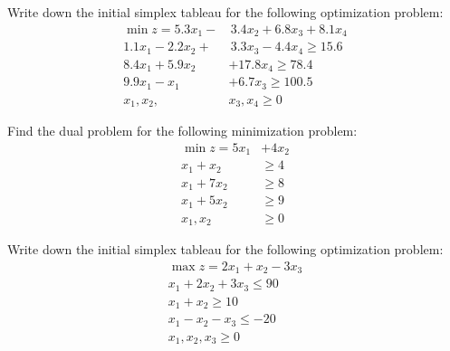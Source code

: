 \documentclass[11pt,letterpaper]{article}
\begin{document}

 Write down the initial simplex tableau for the following optimization problem:
	\[
	\begin{aligned}
	\min z= 5.3x_1 - &\,3.4x_2 + 6.8x_3 + 8.1x_4 \\
	1.1x_1 - 2.2x_2 + &\,3.3x_3 - 4.4x_4 \geq 15.6 \\
	8.4x_1 + 5.9x_2 &+ 17.8x_4 \geq 78.4 \\
	9.9x_1 - x_1 &+ 6.7 x_3 \geq 100.5 \\
	x_1, x_2, &x_3, x_4 \geq 0 
	\end{aligned}
	\]



\newpage



 Find the dual problem for the following minimization problem:
	\[
	\begin{aligned}
	\min z= 5x_1 &+ 4x_2 \\
	x_1 + x_2 &\geq 4 \\
	x_1 + 7x_2 &\geq 8 \\
	x_1 + 5x_2 &\geq 9 \\
	x_1, x_2 &\geq 0 
	\end{aligned}
	\]



\newpage



 Write down the initial simplex tableau for the following optimization problem:
	\[
	\begin{aligned}
	\max z= 2x_1 + x_2 - 3x_3 \\
	x_1 + 2x_2 + 3x_3 \leq 90 \\
	x_1 + x_2 \geq 10 \\
	x_1 - x_2 - x_3 \leq -20 \\
	x_1, x_2, x_3 \geq 0 
	\end{aligned}
	\]
\end{document}

